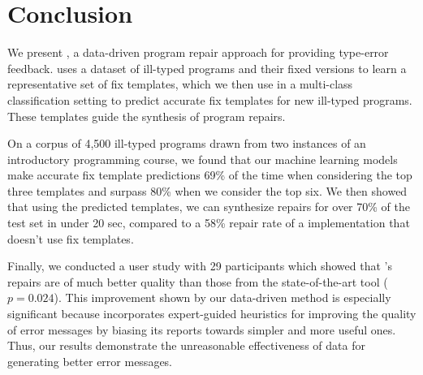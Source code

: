 \section{Conclusion}
\label{sec:conclusion}

We present \toolname, a data-driven program repair approach for providing
type-error feedback. \toolname uses a dataset of ill-typed
programs and their fixed versions to learn a representative set of fix
templates, which we then use in a multi-class classification setting
to predict accurate fix templates for new ill-typed programs. These templates
guide the synthesis of program repairs.

On a corpus of 4,500 ill-typed \ocaml programs drawn from two instances of an
introductory programming course, we found that our machine learning models make
accurate fix template predictions 69\% of the time when considering the top
three templates and surpass 80\% when we consider the top six. We then showed
that using the predicted templates, we can synthesize repairs for over 70\% of
the test set in under 20 sec, compared to a 58\% repair rate of a \naive
implementation that doesn't use fix templates.

Finally, we conducted a user study with 29 participants which showed
that \toolname's repairs are of much better
quality than those from the state-of-the-art tool \seminal ($p=0.024$).
This improvement
shown by our data-driven method is especially significant because \seminal
incorporates expert-guided heuristics for improving the quality of error
messages by biasing its reports towards simpler and more useful ones. Thus, our
results demonstrate the unreasonable effectiveness of data for generating better
error messages.
